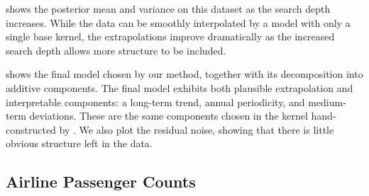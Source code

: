  shows the posterior mean and variance on this dataset as the search depth increases.
While the data can be smoothly interpolated by a model with only a single base kernel, the extrapolations improve dramatically as the increased search depth allows more structure to be included.

 shows the final model chosen by our method, together with its decomposition into additive components.
The final model exhibits both plausible extrapolation and interpretable components: a long-term trend, annual periodicity, and medium-term deviations.
These are the same components chosen in the kernel hand-constructed by \citet[Chapter 5]{rasmussen38gaussian}.
We also plot the residual noise, showing that there is little obvious structure left in the data.  





\subsection{Airline Passenger Counts}

